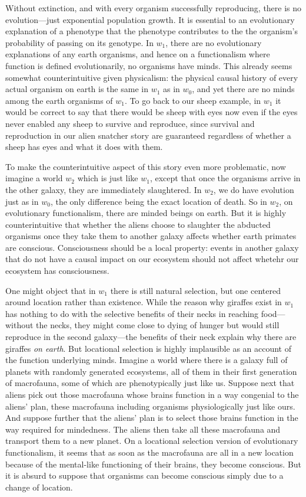 Without extinction, and with every organism successfully reproducing, there is no evolution---just exponential population
growth. It is essential to an evolutionary explanation of a phenotype that the phenotype contributes to the the organism's 
probability of passing on its genotype. In $w_1$, there are no evolutionary explanations of any earth organisms, and 
hence on a functionalism where function is defined evolutionarily, no organisms have minds. This already seems somewhat
counterintuitive given physicalism: the physical causal history of every actual organism on earth is the same in $w_1$ 
as in $w_0$, and yet there are no minds among the earth organisms of $w_1$. To go back to our sheep example, in
$w_1$ it would be correct to say that there would be sheep with eyes now
even if the eyes never enabled any sheep to survive and reproduce, since survival and reproduction in our alien snatcher 
story are guaranteed regardless of whether a sheep has eyes and what it does with them.

To make the counterintuitive aspect of this story even more problematic, now imagine a world $w_2$ which is just like 
$w_1$, except that once the organisms arrive in the other galaxy, they are immediately slaughtered. In $w_2$, we do have
evolution just as in $w_0$, the only difference being the exact location of death. So in $w_2$, on evolutionary functionalism,
there are minded beings on earth. But it is highly counterintuitive that whether the aliens choose to slaughter the 
abducted organisms once they take them to another galaxy affects whether earth primates are conscious.
Consciousness should be a local property: events in another galaxy that do not have a causal impact on our ecosystem
should not affect whetehr our ecosystem has consciousness.

One might object that in $w_1$ there is still natural selection, but one centered around location rather than 
existence. While the reason why giraffes exist in $w_1$ has nothing to do with the selective benefits of their necks in 
reaching food---without the necks, they might come close to dying of hunger but would still reproduce in the second 
galaxy---the benefits of their neck explain why there are giraffes \textit{on earth}. But locational selection is highly
implausible as an account of the function underlying minds. Imagine a world where there is a galaxy full of planets
with randomly generated ecosystems, all of them in their first generation of macrofauna, some of which are 
phenotypically just like us. Suppose next that aliens pick out those macrofauna whose brains function in a way 
congenial to the aliens' plan, these macrofauna including organisms physiologically just like ours. And suppose
further that the aliens' plan is to select those brains function in the way required for mindedness. 
The aliens then take all these macrofauna and transport them to a new planet. On a locational selection version 
of evolutionary functionalism, it seems that as soon as the macrofauna are all in a new location because of the 
mental-like functioning of their brains, they become conscious. But it is absurd to suppose that organisms can 
become conscious simply due to a change of location.  

